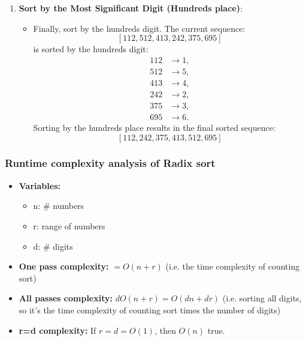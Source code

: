 \begin{example}
\begin{enumerate}
        \item \textbf{Sort by the Most Significant Digit (Hundreds place)}:
        \begin{itemize}
            \item Finally, sort by the hundreds digit. The current sequence:
            \[
            [112, 512, 413, 242, 375, 695]
            \]
            is sorted by the hundreds digit:
            \begin{align*}
            112 & \rightarrow 1, \\
            512 & \rightarrow 5, \\
            413 & \rightarrow 4, \\
            242 & \rightarrow 2, \\
            375 & \rightarrow 3, \\
            695 & \rightarrow 6.
            \end{align*}
            Sorting by the hundreds place results in the final sorted sequence:
            \[
            [112, 242, 375, 413, 512, 695]
            \]
        \end{itemize}
        
    \end{enumerate}

\end{example}

\subsubsection{Runtime complexity analysis of Radix sort}
\begin{definition}
    \begin{itemize}
        \item \textbf{Variables:}
        \begin{itemize}
            \item n: \# numbers 
            \item r: range of numbers 
            \item d: \# digits
        \end{itemize}

        \item \textbf{One pass complexity:} $=O(n+r)$ (i.e. the time complexity of counting sort)
        \item \textbf{All passes complexity:} $dO(n+r) = O(dn + dr)$ (i.e. sorting all digits, so it's the time complexity of counting sort times the number of digits)
        \item \textbf{r=d complexity:} If $r=d=O(1)$, then $O(n)$ true.
    \end{itemize}
\end{definition}


